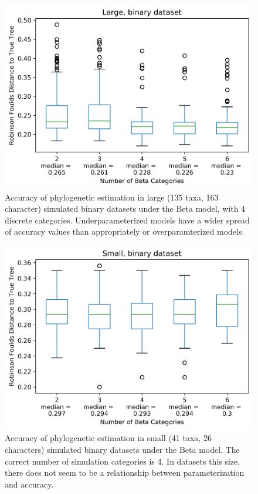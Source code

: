 \documentclass[]{sysbio}
\begin{document}
\begin{figure}
  \caption{Accuracy of phylogenetic estimation in large (135 taxa, 163 character) simulated binary datasets under the Beta model, with 4 discrete categories. Underparameterized models have a wider spread of accuracy values than appropriately or overparamterized models.} 
    \includegraphics{fig/LargeBinary}
\end{figure} 


\begin{figure}
  \caption{Accuracy of phylogenetic estimation in small (41 taxa, 26 characters) simulated binary datasets under the Beta model. The correct number of simulation categories is 4. In datasets this size, there does not seem to be a relationship between parameterization and accuracy. } 
    \includegraphics{fig/SmallBinary}
\end{figure} 
\end{document}
